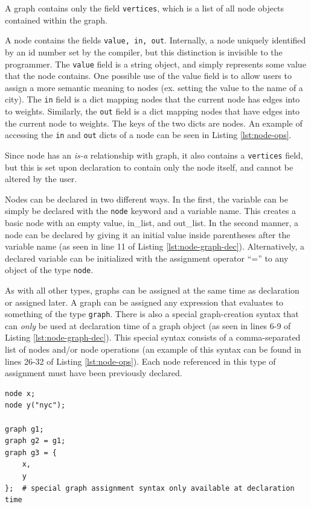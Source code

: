 \documentclass{article}
\newcommand{\code}[1]{\texttt{#1}} %
\begin{document}
A graph contains only the field \code{vertices}, which is a list of all node objects contained within the graph. 

A node contains the fields \code{value, in, out}. Internally, a node uniquely identified by an id number set by the compiler, but this distinction is invisible to the programmer. The \code{value} field is a string object, and simply represents some value that the node contains. One possible use of the value field is to allow users to assign a more semantic meaning to nodes (ex. setting the value to the name of a city). The \code{in} field is a dict mapping nodes that the current node has edges into to weights. Similarly, the \code{out} field is a dict mapping nodes that have edges into the current node to weights. The keys of the two dicts are nodes. An example of accessing the \code{in} and \code{out} dicts of a node can be seen in Listing \ref{lst:node-ops}.

Since node has an \emph{is-a} relationship with graph, it also contains a \code{vertices} field, but this is set upon declaration to contain only the node itself, and cannot be altered by the user.

Nodes can be declared in two different ways. In the first, the variable can be simply be declared with the \code{node} keyword and a variable name. This creates a basic node with an empty value, in\_list, and out\_list. In the second manner, a node can be declared by giving it an initial value inside parentheses after the variable name (as seen in line 11 of Listing \ref{lst:node-graph-dec}). Alternatively, a declared variable can be initialized with the assignment operator ``='' to any object of the type \code{node}.

As with all other types, graphs can be assigned at the same time as declaration or assigned later. A graph can be assigned any expression that evaluates to something of the type \code{graph}. There is also a special graph-creation syntax that can \emph{only} be used at declaration time of a graph object  (as seen in lines 6-9 of Listing \ref{lst:node-graph-dec}). This special syntax consists of a comma-separated list of nodes and/or node operations (an example of this syntax can be found in lines 26-32 of Listing \ref{lst:node-ops}). Each node referenced in this type of assignment must have been previously declared. \\

\begin{lstlisting}[language=pltLang, caption=Declaration of ``node'' and ``graph'' objects., label=lst:node-graph-dec]
node x;
node y("nyc");

graph g1;
graph g2 = g1;
graph g3 = { 
    x,
    y
};  # special graph assignment syntax only available at declaration time

\end{lstlisting}
\end{document}
